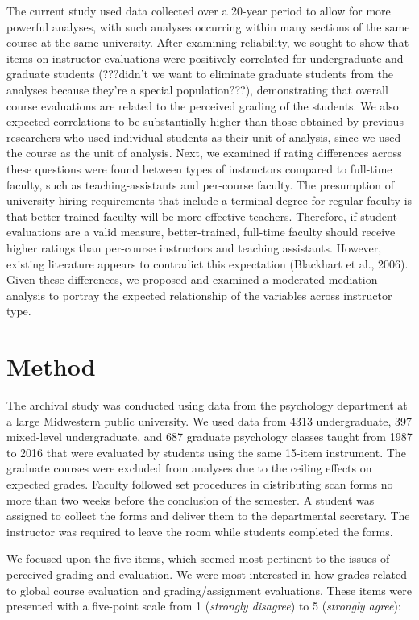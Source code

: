 \documentclass[man]{apa6}
\theoremstyle{definition}
\theoremstyle{definition}
\theoremstyle{definition}
\theoremstyle{remark}
\begin{document}
The current study used data collected over a 20-year period to allow for
more powerful analyses, with such analyses occurring within many
sections of the same course at the same university. After examining
reliability, we sought to show that items on instructor evaluations were
positively correlated for undergraduate and graduate students (???didn't
we want to eliminate graduate students from the analyses because they're
a special population???), demonstrating that overall course evaluations
are related to the perceived grading of the students. We also expected
correlations to be substantially higher than those obtained by previous
researchers who used individual students as their unit of analysis,
since we used the course as the unit of analysis. Next, we examined if
rating differences across these questions were found between types of
instructors compared to full-time faculty, such as teaching-assistants
and per-course faculty. The presumption of university hiring
requirements that include a terminal degree for regular faculty is that
better-trained faculty will be more effective teachers. Therefore, if
student evaluations are a valid measure, better-trained, full-time
faculty should receive higher ratings than per-course instructors and
teaching assistants. However, existing literature appears to contradict
this expectation (Blackhart et al., 2006). Given these differences, we
proposed and examined a moderated mediation analysis to portray the
expected relationship of the variables across instructor type.

\hypertarget{method}{%
\section{Method}\label{method}}

The archival study was conducted using data from the psychology
department at a large Midwestern public university. We used data from
4313 undergraduate, 397 mixed-level undergraduate, and 687 graduate
psychology classes taught from 1987 to 2016 that were evaluated by
students using the same 15-item instrument. The graduate courses were
excluded from analyses due to the ceiling effects on expected grades.
Faculty followed set procedures in distributing scan forms no more than
two weeks before the conclusion of the semester. A student was assigned
to collect the forms and deliver them to the departmental secretary. The
instructor was required to leave the room while students completed the
forms.

We focused upon the five items, which seemed most pertinent to the
issues of perceived grading and evaluation. We were most interested in
how grades related to global course evaluation and grading/assignment
evaluations. These items were presented with a five-point scale from 1
(\emph{strongly disagree}) to 5 (\emph{strongly agree}):
\end{document}
